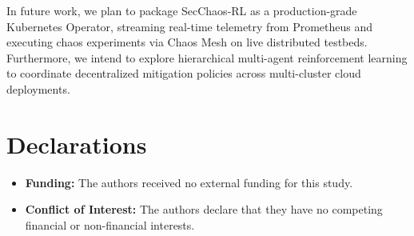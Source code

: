 \documentclass[11pt,a4paper]{article}
\begin{document}
In future work, we plan to package SecChaos-RL as a production-grade Kubernetes Operator, streaming real-time telemetry from Prometheus and executing chaos experiments via Chaos Mesh on live distributed testbeds. Furthermore, we intend to explore hierarchical multi-agent reinforcement learning to coordinate decentralized mitigation policies across multi-cluster cloud deployments.

\section*{Declarations}
\begin{itemize}
    \item \textbf{Funding:} The authors received no external funding for this study.
    \item \textbf{Conflict of Interest:} The authors declare that they have no competing financial or non-financial interests.
    
 
\end{itemize}



\end{document}
